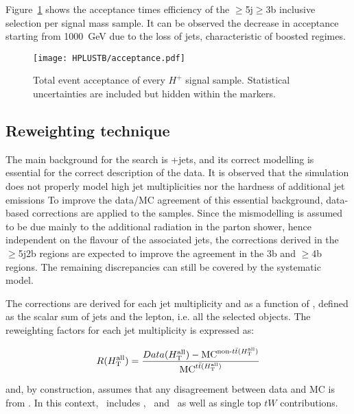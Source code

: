 Figure~\ref{Hplustb:acceptance} shows the acceptance times efficiency of the $\geq$5j$\geq$3b inclusive selection per signal mass sample. It can be observed the decrease in acceptance starting from 1000~GeV due to the loss of jets, characteristic of boosted regimes.

\begin{figure}[htbp]
    \RawFloats
    \begin{center}
    \texttt{[image: HPLUSTB/acceptance.pdf]}
    \caption{
        Total event acceptance of every $H^+$ signal sample. Statistical uncertainties are included but hidden within the markers.
    }
    \label{Hplustb:acceptance}
    \end{center}
\end{figure}

\clearpage
\subsection{Reweighting technique}

The main background for the search is \ttbar+jets, and its correct modelling is essential for the correct description of the data. It is observed that the simulation does not properly model high jet multiplicities nor the hardness of additional jet emissions %
To improve the data/MC agreement of this essential background, data-based corrections are applied to the \ttbar samples. Since the mismodelling is assumed to be due mainly to the additional radiation in the parton shower, hence independent on the flavour of the associated jets, the corrections derived in the $\geq$5j2b regions are expected to improve the agreement in the 3b and $\geq$4b regions. The remaining discrepancies can still be covered by the systematic model.

The corrections are derived for each jet multiplicity and as a function of \HTall, defined as the scalar \pT sum of jets and the lepton, i.e. all the selected objects. The reweighting factors for each jet multiplicity is expressed as:

\begin{equation}
    \label{Hplustb:RWeq}
    R(H_{\text{T}}^{\text{all}})=\frac{ Data(H_{\text{T}}^{\text{all}}) - \text{MC}^{\text{non-\ensuremath{t\bar{t}}}(H_{\text{T}}^{\text{all}})} }{\text{MC}^{\text{\ensuremath{t\bar{t}}}(H_{\text{T}}^{\text{all}})}}
\end{equation}

and, by construction, assumes that any disagreement between data and MC is from \ttbar. In this context, \ttbar\ includes \ttb, \ttc\ and \ttl\ as well as single top $tW$ contributions. 

